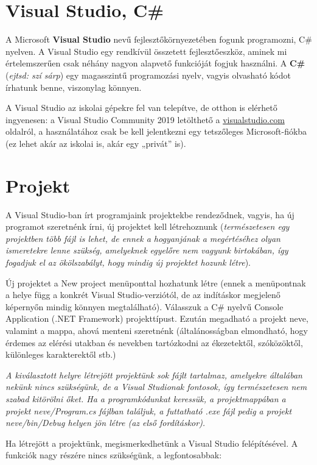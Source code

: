 \documentclass[a4paper]{article}
\begin{document}
\section{Visual Studio, C\#}
A Microsoft \textbf{Visual Studio} nevű fejlesztőkörnyezetében fogunk programozni, C\# nyelven. A Visual Studio egy rendkívül összetett fejlesztőeszköz, aminek mi értelemszerűen csak néhány nagyon alapvető funkcióját fogjuk használni. A \textbf{C\#} (\emph{ejtsd: szí sárp}) egy magasszintű programozási nyelv, vagyis olvasható kódot írhatunk benne, viszonylag könnyen.

A Visual Studio az iskolai gépekre fel van telepítve, de otthon is elérhető ingyenesen: a Visual Studio Community 2019 letölthető a \href{https://visualstudio.microsoft.com/}{visualstudio.com} oldalról, a használatához csak be kell jelentkezni egy tetszőleges Microsoft-fiókba (ez lehet akár az iskolai is, akár egy „privát” is).

\section{Projekt}
A Visual Studio-ban írt programjaink projektekbe rendeződnek, vagyis, ha új programot szeretnénk írni, új projektet kell létrehoznunk (\emph{természetesen egy projektben több fájl is lehet, de ennek a hogyanjának a megértéséhez olyan ismeretekre lenne szükség, amelyeknek egyelőre nem vagyunk birtokában, így fogadjuk el az ökölszabályt, hogy mindig új projektet hozunk létre}).

Új projektet a New project menüponttal hozhatunk létre (ennek a menüpontnak a helye függ a konkrét Visual Studio-verziótól, de az indításkor megjelenő képernyőn mindig könnyen megtalálható). Válasszuk a C\# nyelvű Console Application (.NET Framework) projekttípust. Ezután megadható a projekt neve, valamint a mappa, ahová menteni szeretnénk (általánosságban elmondható, hogy érdemes az elérési utakban és nevekben tartózkodni az ékezetektől, szóközöktől, különleges karakterektől stb.)

\emph{A kiválasztott helyre létrejött projektünk sok fájlt tartalmaz, amelyekre általában nekünk nincs szükségünk, de a Visual Studionak fontosok, így természetesen nem szabad kitörölni őket. Ha a programkódunkat keressük, a projektmappában a projekt neve/Program.cs fájlban találjuk, a futtatható .exe fájl pedig a projekt neve/bin/Debug helyen jön létre (az első fordításkor).}

Ha létrejött a projektünk, megismerkedhetünk a Visual Studio felépítésével. A funkciók nagy részére nincs szükségünk, a legfontosabbak:
\end{document}
